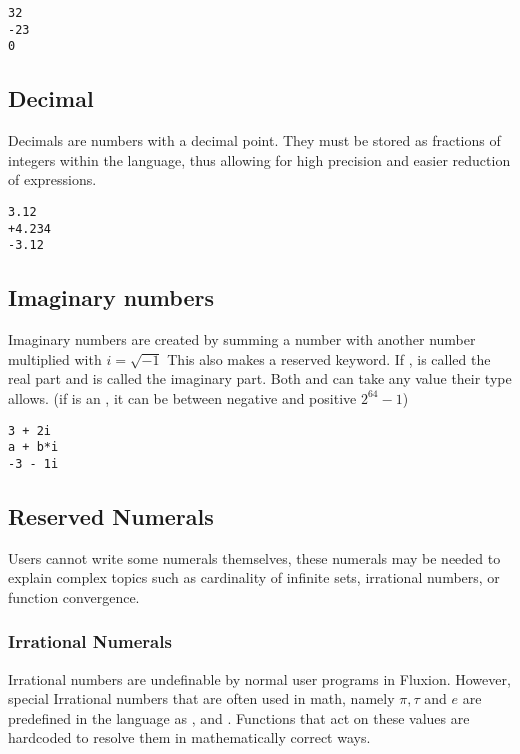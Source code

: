 \documentclass[11pt,a4paper]{book}
\begin{document}
\begin{lstlisting}[caption={Example integers},captionpos=b]
32
-23
0
\end{lstlisting}

\subsection{Decimal}

Decimals are numbers with a decimal point. They must be stored as fractions of integers within the language, thus allowing for high precision and easier reduction of expressions.

\begin{lstlisting}[caption={Example decimals},captionpos=b]
3.12
+4.234
-3.12
\end{lstlisting}

\subsection{Imaginary numbers}

Imaginary numbers are created by summing a number with another number multiplied with $i = \sqrt{-1}$ This also makes  a reserved keyword. If ,  is called the real part and  is called the imaginary part. Both  and  can take any value their type allows. (if  is an , it can be between negative and positive $2^{64} - 1$)

\begin{lstlisting}[caption={Example imaginals},captionpos=b]
3 + 2i
a + b*i
-3 - 1i
\end{lstlisting}

\subsection{Reserved Numerals}

Users cannot write some numerals themselves, these numerals may be needed to explain complex topics such as cardinality of infinite sets, irrational numbers, or function convergence.

\subsubsection{Irrational Numerals}
Irrational numbers are undefinable by normal user programs in Fluxion. However, special Irrational numbers that are often used in math, namely $\pi, \tau$ and $e$ are predefined in the language as ,  and . Functions that act on these values are hardcoded to resolve them in mathematically correct ways.\\
\end{document}
